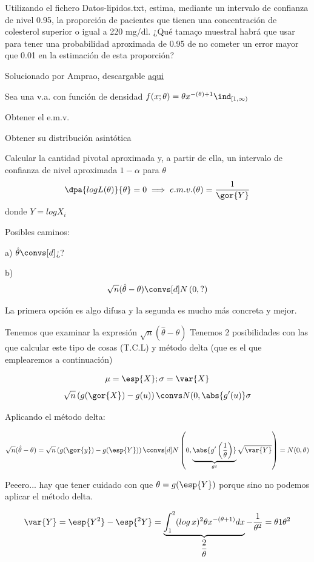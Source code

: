 \begin{problem}[4]
\ppart Utilizando el fichero Datos-lipidos.txt, estima, mediante un intervalo de confianza de nivel
0.95, la proporción de pacientes que tienen una concentración de colesterol superior o igual a
220 mg/dl. ¿Qué tamaço muestral habrá que usar para tener una probabilidad aproximada de 0.95 de no cometer un error mayor que 0.01 en la estimación de esta proporción?

\ppart
\solution
Solucionado por Amprao, descargable 
\href{http://www.uam.es/personal_pdi/ciencias/abaillo/MatEstI/T4DatosLipidos.pdf}{aqui}
\end{problem}
\begin{problem}[5] Sea una v.a. con función de densidad $f(x;\theta) = \theta x^{-(\theta) + 1}\ind_{[1,\infty)} $

\ppart Obtener el e.m.v.

\ppart Obtener su distribución asintótica

\ppart Calcular la cantidad pivotal aproximada y, a partir de ella, un intervalo de confianza de nivel aproximada $1-\alpha$ para $\theta$
\solution
\spart \[\dpa{logL(\theta)}{\theta} = 0 \implies e.m.v.(\theta) = \frac{1}{\gor{Y}}\]
donde $Y = log X_i$

\spart Posibles caminos:

a) $\hat{\theta} \convs[d] $¿?

b) \[\sqrt{n}(\hat{\theta} - \theta) \convs[d] N\left(0,?\right)\]

La primera opción es algo difusa y la segunda es mucho más concreta y mejor.

Tenemos que examinar la expresión $\sqrt{n}(\hat{\theta} - \theta)$
Tenemos 2 posibilidades con las que calcular este tipo de cosas (T.C.L) y método delta (que es el que emplearemos a continuación)

\[\mu = \esp{X}; \sigma = \var{X}\]
\[\sqrt{n}\left(g(\gor{X}) - g(u)\right) \convs N(0,\abs{g'(u)} \sigma\]

Aplicando el método delta:

\[
\sqrt{n}(\hat{\theta} - \theta) = \sqrt{ n}\left(g(\gor{y})-g(\esp{Y})\right)\convs[d] N\left(0,\underbrace{\abs{g'\left(\frac{1}{\theta}\right)}}_{\theta^2} \sqrt{\var{Y}}\right) = N(0,\theta)
\]

Peeero... hay que tener cuidado con que $\theta = g(\esp{Y})$ porque sino no podemos aplicar el método delta.

\[
\var{Y} = \esp{Y^2} - \esp{^2 Y} = \underbrace{\int_1^2 (log\,x)^2 \theta x^{-(\theta + 1)}dx}_{\displaystyle\frac{2}{\theta}} - \frac{1}{\theta^2} = \theta{1}{\theta^2}
\]


\end{problem}
